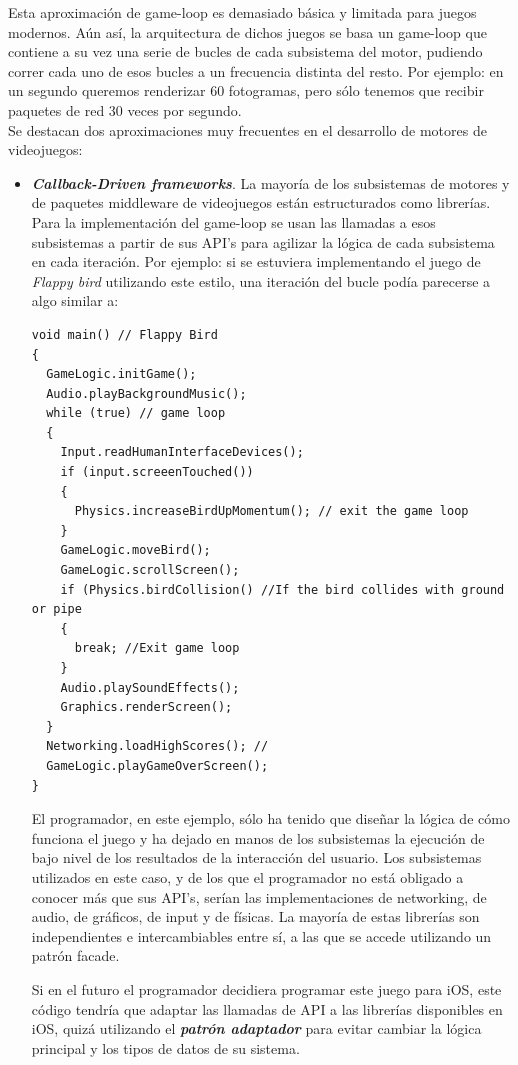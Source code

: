 \documentclass[a4paper,12pt]{report}
\begin{document}
	Esta aproximación de game-loop es demasiado básica y limitada para juegos modernos. Aún así, la arquitectura de dichos juegos se basa un game-loop que contiene a su vez una serie de bucles de cada subsistema del motor, pudiendo correr cada uno de esos bucles a un frecuencia distinta del resto. Por ejemplo: en un segundo queremos renderizar 60 fotogramas, pero sólo tenemos que recibir paquetes de red 30 veces por segundo. \\
   
	Se destacan dos aproximaciones muy frecuentes en el desarrollo de motores de videojuegos:
	
	\begin{itemize}
		\item \textbf{\textit{Callback-Driven frameworks}}. La mayoría de los subsistemas de motores y de paquetes middleware de videojuegos están estructurados como librerías. Para la implementación del game-loop se usan las llamadas a esos subsistemas a partir de sus API's para agilizar la lógica de cada subsistema en cada iteración. Por ejemplo: si se estuviera implementando el juego de \textit{Flappy bird} utilizando este estilo, una iteración del bucle podía parecerse a algo similar a:
		\newpage
		\begin{lstlisting}[style=C, numbers=none]
void main() // Flappy Bird
{
  GameLogic.initGame();
  Audio.playBackgroundMusic();
  while (true) // game loop
  {
    Input.readHumanInterfaceDevices();
    if (input.screeenTouched())
    {
      Physics.increaseBirdUpMomentum(); // exit the game loop
    }
    GameLogic.moveBird();
    GameLogic.scrollScreen();
    if (Physics.birdCollision() //If the bird collides with ground or pipe
    {
      break; //Exit game loop
    }
    Audio.playSoundEffects();
    Graphics.renderScreen();
  }
  Networking.loadHighScores(); //
  GameLogic.playGameOverScreen();
}
		\end{lstlisting}
		
		
		El programador, en este ejemplo, sólo ha tenido que diseñar la lógica de cómo funciona el juego y ha dejado en manos de los subsistemas la ejecución de bajo nivel de los resultados de la interacción del usuario. Los subsistemas utilizados en este caso, y de los que el programador no está obligado a conocer más que sus API's, serían las implementaciones de networking, de audio, de gráficos, de input y de físicas. La mayoría de estas librerías son independientes e intercambiables entre sí, a las que se accede utilizando un patrón facade.
		
		Si en el futuro el programador decidiera programar este juego para iOS, este código tendría que adaptar las llamadas de API a las librerías disponibles en iOS, quizá utilizando el \textit{\textbf{patrón adaptador}} para evitar cambiar la lógica principal y los tipos de datos de su sistema.\\
		

\end{itemize}
\end{document}
